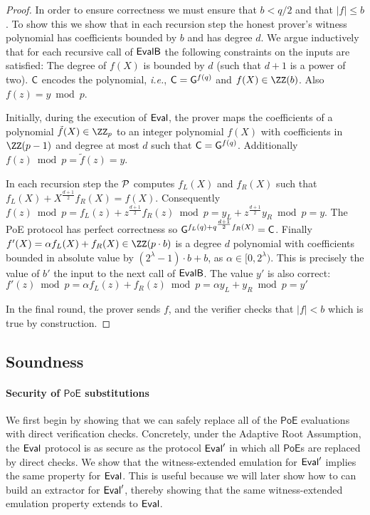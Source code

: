 \begin{proof}
In order to ensure correctness we must ensure that $b< q/2$ and that $|f|\leq b$. To show this we show that in each recursion step the honest prover's witness polynomial has coefficients bounded by $b$ and has degree $d$. 
We argue inductively that for each recursive call of $\textsf{{EvalB}}$ the following constraints on the inputs are satisfied: The degree of $f(X)$ is bounded by $d$ (such that $d+1$ is a power of two). $\gr{C}$ encodes the polynomial, \emph{i.e.}, $\gr{C}=\gr{g}^{f(q)}$ and $f(X)\in \ZZ(b)$. Also $f(z) = y\bmod p$.

Initially, during the execution of $\textsf{{Eval}}$, the prover maps the coefficients of a polynomial $\tilde{f}(X)\in \ZZ_p$ to an integer polynomial $f(X)$ with coefficients in $\ZZ(p-1)$ and degree at most $d$ such that $\gr{C}=\gr{g}^{f(q)}$. Additionally $f(z)\bmod p=\tilde{f}(z)=y$.

 
In each recursion step the $\mathcal{P}$ computes $f_L(X)$ and $f_R(X)$ such that $f_L(X)+X^{\frac{d+1}{2}} f_R(X)=f(X)$. Consequently $f(z) \bmod p=f_L(z)+ z^{\frac{d+1}{2}} f_R(z)\bmod p=y_L+z^{\frac{d+1}{2}}  y_R\bmod p =y$. The \textsf{PoE} protocol has perfect correctness so {$\gr{g}^{f_L(q)+q^{\frac{d+1}{2}} f_R(X)}=\gr{C}$}.
 Finally $f'(X)=\alpha f_L(X) + f_R(X)\in \ZZ(p \cdot b)$ is a degree $d$ polynomial with coefficients bounded in absolute value by $(2^\lambda-1) \cdot b+b$, as $\alpha\in [0,2^\lambda)$. This is precisely the value of $b'$ the input to the next call of $\textsf{{EvalB}}$. The value $y'$ is also correct:
$f'(z)\bmod p=\alpha f_L(z) +f_R(z) \bmod p= \alpha y_L +y_R\bmod p=y'$
 
 In the final round, the prover sends $f$, and the verifier checks that $|f|<b$ which is true by construction.
\end{proof} 

\subsection{Soundness}
\label{sec:darksoundness}
\paragraph{Security of $\textsf{PoE}$ substitutions}
We first begin by showing that we can safely replace all of the $\textsf{PoE}$ evaluations with direct verification checks. Concretely, under the Adaptive Root Assumption, the $\textsf{{Eval}}$ protocol is as secure as the protocol $\textsf{{Eval}}'$ in which all $\textsf{PoE}$s are replaced by direct checks. We show that the witness-extended emulation for $\textsf{{Eval}}'$ implies the same property for $\textsf{{Eval}}$. This is useful because we will later show how to can build an extractor for $\textsf{{Eval}}'$, thereby showing that the same witness-extended emulation property extends to $\textsf{{Eval}}$.

